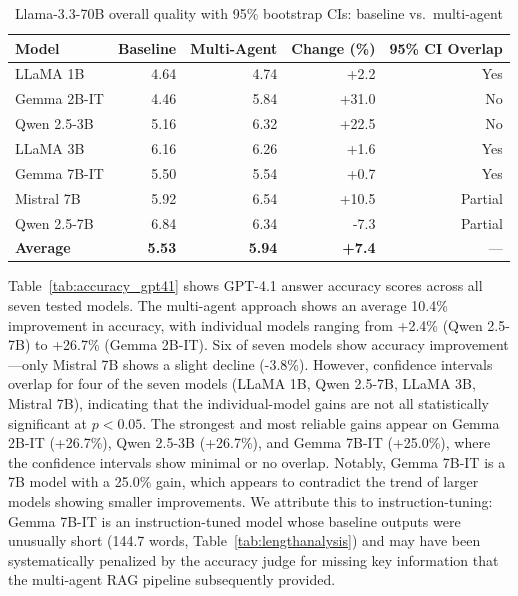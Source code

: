 \begin{table}[h]
\centering
\caption{Llama-3.3-70B overall quality with 95\% bootstrap CIs: baseline vs.\ multi-agent}
\label{tab:accuracy_llama70b}
\begin{tabular}{lrrrr}
\toprule
\textbf{Model} & \textbf{Baseline} & \textbf{Multi-Agent} & \textbf{Change (\%)} & \textbf{95\% CI Overlap} \\
\midrule
LLaMA 1B & 4.64 & 4.74 & +2.2 & Yes \\
Gemma 2B-IT & 4.46 & 5.84 & +31.0 & No \\
Qwen 2.5-3B & 5.16 & 6.32 & +22.5 & No \\
LLaMA 3B & 6.16 & 6.26 & +1.6 & Yes \\
Gemma 7B-IT & 5.50 & 5.54 & +0.7 & Yes \\
Mistral 7B & 5.92 & 6.54 & +10.5 & Partial \\
Qwen 2.5-7B & 6.84 & 6.34 & -7.3 & Partial \\
\midrule
\textbf{Average} & \textbf{5.53} & \textbf{5.94} & \textbf{+7.4} & --- \\
\bottomrule
\end{tabular}
\end{table}

Table~\ref{tab:accuracy_gpt41} shows GPT-4.1 answer accuracy scores across all seven tested models. The multi-agent approach shows an average 10.4\% improvement in accuracy, with individual models ranging from +2.4\% (Qwen 2.5-7B) to +26.7\% (Gemma 2B-IT). Six of seven models show accuracy improvement---only Mistral 7B shows a slight decline (-3.8\%). However, confidence intervals overlap for four of the seven models (LLaMA 1B, Qwen 2.5-7B, LLaMA 3B, Mistral 7B), indicating that the individual-model gains are not all statistically significant at $p<0.05$. The strongest and most reliable gains appear on Gemma 2B-IT (+26.7\%), Qwen 2.5-3B (+26.7\%), and Gemma 7B-IT (+25.0\%), where the confidence intervals show minimal or no overlap. Notably, Gemma 7B-IT is a 7B model with a 25.0\% gain, which appears to contradict the trend of larger models showing smaller improvements. We attribute this to instruction-tuning: Gemma 7B-IT is an instruction-tuned model whose baseline outputs were unusually short (144.7 words, Table~\ref{tab:lengthanalysis}) and may have been systematically penalized by the accuracy judge for missing key information that the multi-agent RAG pipeline subsequently provided.


